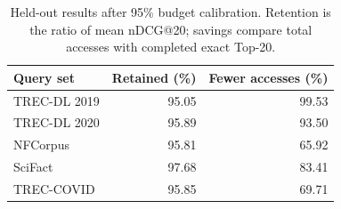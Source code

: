 \begin{table}[H]
\centering
\caption{Held-out results after 95\% budget calibration. Retention is the ratio of mean nDCG@20; savings compare total accesses with completed exact Top-20.}
\label{tab:quality}
\small\setlength{\tabcolsep}{3pt}
\begin{tabular}{lrr}
\toprule
Query set & Retained (\%) & Fewer accesses (\%) \\
\midrule
TREC-DL 2019 & 95.05 & 99.53 \\
TREC-DL 2020 & 95.89 & 93.50 \\
NFCorpus & 95.81 & 65.92 \\
SciFact & 97.68 & 83.41 \\
TREC-COVID & 95.85 & 69.71 \\
\bottomrule
\end{tabular}
\end{table}

